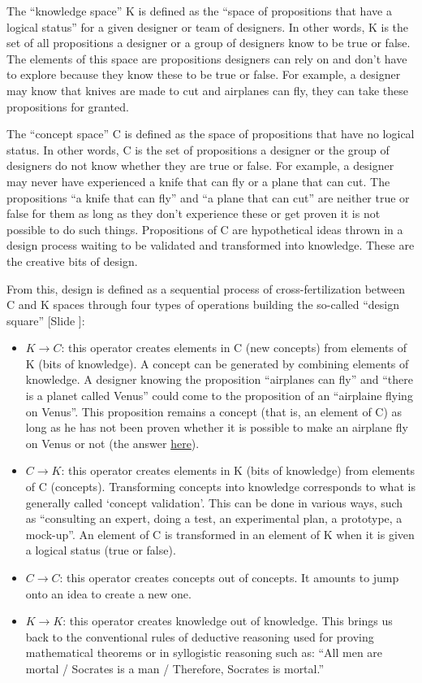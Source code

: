 \documentclass{article}
\newcounter{slide}
\begin{document}
The ``knowledge space'' K is defined as the ``space of propositions that have a logical status'' for a given designer or team of designers. In other words, K is the set of all propositions a designer or a group of designers know to be true or false. The elements of this space are propositions designers can rely on and don't have to explore because they know these to be true or false. For example, a designer may know that knives are made to cut and airplanes can fly, they can take these propositions for granted. 

The ``concept space'' C is defined as the space of propositions that have no logical status. In other words, C is the set of propositions a designer or the group of designers do not know whether they are true or false. For example, a designer may never have experienced a knife that can fly or a plane that can cut. The propositions ``a knife that can fly'' and ``a plane that can cut'' are neither true or false for them as long as they don't experience these or get proven it is not possible to do such things. Propositions of C are hypothetical ideas thrown in a design process waiting to be validated and transformed into knowledge. These are the creative bits of design. 

From this, design is defined as a sequential process of cross-fertilization between C and K spaces through four types of operations building the so-called ``design square'' {\color{blue}[Slide ]}:
\begin{itemize}
	\item $K\rightarrow C$: this operator creates elements in C (new concepts) from elements of K (bits of knowledge). A concept can be generated by combining elements of knowledge. A designer knowing the proposition ``airplanes can fly'' and ``there is a planet called Venus'' could come to the proposition of an ``airplaine flying on Venus''. This proposition remains a concept (that is, an element of C) as long as he has not been proven whether it is possible to make an airplane fly on Venus or not (the answer \href{https://whatif.xkcd.com/book/}{here}).
	\item $C\rightarrow K$: this operator creates elements in K (bits of knowledge) from elements of C (concepts). Transforming concepts into knowledge corresponds to what is generally called `concept validation'. This can be done in various ways, such as ``consulting an expert, doing a test, an experimental plan, a prototype, a mock-up''. An element of C is transformed in an element of K when it is given a logical status (true or false).
	\item $C\rightarrow C$: this operator creates concepts out of concepts. It amounts to jump onto an idea to create a new one.
	\item $K\rightarrow K$: this operator creates knowledge out of knowledge. This brings us back to the conventional rules of deductive reasoning used for proving mathematical theorems or in syllogistic reasoning such as: ``All men are mortal / Socrates is a man / Therefore, Socrates is mortal.'' 
\end{itemize}
\end{document}
